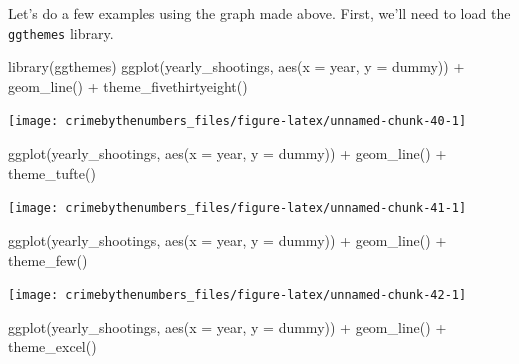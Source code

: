 \documentclass[
  12pt,
]{book}
\newenvironment{Shaded}{\begin{snugshade}}{\end{snugshade}}
\newcommand{\AttributeTok}[1]{\textcolor[rgb]{0.61,0.61,0.61}{#1}}
\newcommand{\FunctionTok}[1]{\textcolor[rgb]{0,0,0}{#1}}
\newcommand{\NormalTok}[1]{#1}
\newcommand{\SpecialCharTok}[1]{\textcolor[rgb]{0,0,0}{#1}}
\begin{document}
Let's do a few examples using the graph made above. First, we'll need to load the \texttt{ggthemes} library.

\begin{Shaded}
\begin{Highlighting}[]
\FunctionTok{library}\NormalTok{(ggthemes)}
\FunctionTok{ggplot}\NormalTok{(yearly\_shootings, }\FunctionTok{aes}\NormalTok{(}\AttributeTok{x =}\NormalTok{ year, }\AttributeTok{y =}\NormalTok{ dummy)) }\SpecialCharTok{+}
  \FunctionTok{geom\_line}\NormalTok{() }\SpecialCharTok{+}
  \FunctionTok{theme\_fivethirtyeight}\NormalTok{()}
\end{Highlighting}
\end{Shaded}

\begin{center}\texttt{[image: crimebythenumbers\_files/figure-latex/unnamed-chunk-40-1]} \end{center}

\begin{Shaded}
\begin{Highlighting}[]
\FunctionTok{ggplot}\NormalTok{(yearly\_shootings, }\FunctionTok{aes}\NormalTok{(}\AttributeTok{x =}\NormalTok{ year, }\AttributeTok{y =}\NormalTok{ dummy)) }\SpecialCharTok{+}
  \FunctionTok{geom\_line}\NormalTok{() }\SpecialCharTok{+}
  \FunctionTok{theme\_tufte}\NormalTok{()}
\end{Highlighting}
\end{Shaded}

\begin{center}\texttt{[image: crimebythenumbers\_files/figure-latex/unnamed-chunk-41-1]} \end{center}

\begin{Shaded}
\begin{Highlighting}[]
\FunctionTok{ggplot}\NormalTok{(yearly\_shootings, }\FunctionTok{aes}\NormalTok{(}\AttributeTok{x =}\NormalTok{ year, }\AttributeTok{y =}\NormalTok{ dummy)) }\SpecialCharTok{+}
  \FunctionTok{geom\_line}\NormalTok{() }\SpecialCharTok{+}
  \FunctionTok{theme\_few}\NormalTok{()}
\end{Highlighting}
\end{Shaded}

\begin{center}\texttt{[image: crimebythenumbers\_files/figure-latex/unnamed-chunk-42-1]} \end{center}

\begin{Shaded}
\begin{Highlighting}[]
\FunctionTok{ggplot}\NormalTok{(yearly\_shootings, }\FunctionTok{aes}\NormalTok{(}\AttributeTok{x =}\NormalTok{ year, }\AttributeTok{y =}\NormalTok{ dummy)) }\SpecialCharTok{+}
  \FunctionTok{geom\_line}\NormalTok{() }\SpecialCharTok{+}
  \FunctionTok{theme\_excel}\NormalTok{()}
\end{Highlighting}
\end{Shaded}
\end{document}
